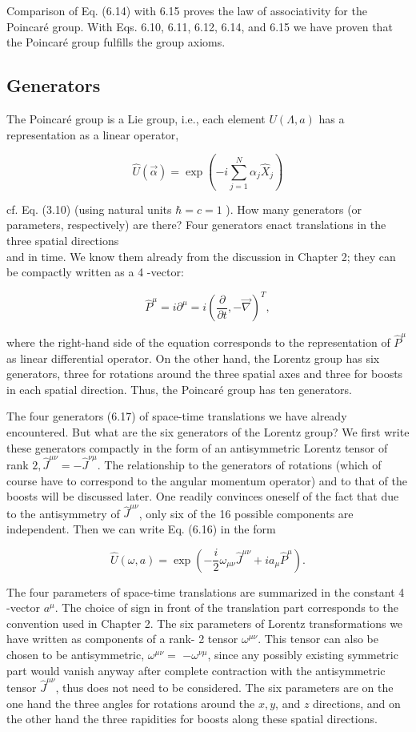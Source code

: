 \documentclass[10pt, letterpaper]{article}
\begin{document}
Comparison of Eq. (6.14) with 6.15 proves the law of associativity for the Poincaré group. With Eqs. 6.10, 6.11, 6.12, 6.14, and 6.15 we have proven that the Poincaré group fulfills the group axioms.

\subsection{Generators}
The Poincaré group is a Lie group, i.e., each element $U(\Lambda, a)$ has a representation as a linear operator,

$$
\hat{U}(\vec{\alpha})=\exp \left(-i \sum_{j=1}^{N} \alpha_{j} \hat{X}_{j}\right)
$$

cf. Eq. (3.10) (using natural units $\hbar=c=1$ ). How many generators (or parameters, respectively) are there? Four generators enact translations in the three spatial directions\\
and in time. We know them already from the discussion in Chapter 2; they can be compactly written as a 4 -vector:

$$
\hat{P}^{\mu}=i \partial^{\mu}=i\left(\frac{\partial}{\partial t},-\vec{\nabla}\right)^{T},
$$

where the right-hand side of the equation corresponds to the representation of $\hat{P}^{\mu}$ as linear differential operator. On the other hand, the Lorentz group has six generators, three for rotations around the three spatial axes and three for boosts in each spatial direction. Thus, the Poincaré group has ten generators.

The four generators (6.17) of space-time translations we have already encountered. But what are the six generators of the Lorentz group? We first write these generators compactly in the form of an antisymmetric Lorentz tensor of rank $2, \hat{J}^{\mu \nu}=-\hat{J}^{\nu \mu}$. The relationship to the generators of rotations (which of course have to correspond to the angular momentum operator) and to that of the boosts will be discussed later. One readily convinces oneself of the fact that due to the antisymmetry of $\hat{J}^{\mu \nu}$, only six of the 16 possible components are independent. Then we can write Eq. (6.16) in the form

$$
\hat{U}(\omega, a)=\exp \left(-\frac{i}{2} \omega_{\mu \nu} \hat{J}^{\mu \nu}+i a_{\mu} \hat{P}^{\mu}\right) .
$$

The four parameters of space-time translations are summarized in the constant 4 -vector $a^{\mu}$. The choice of sign in front of the translation part corresponds to the convention used in Chapter 2. The six parameters of Lorentz transformations we have written as components of a rank- 2 tensor $\omega^{\mu \nu}$. This tensor can also be chosen to be antisymmetric, $\omega^{\mu \nu}=$ $-\omega^{\nu \mu}$, since any possibly existing symmetric part would vanish anyway after complete contraction with the antisymmetric tensor $\hat{J}^{\mu \nu}$, thus does not need to be considered. The six parameters are on the one hand the three angles for rotations around the $x, y$, and $z$ directions, and on the other hand the three rapidities for boosts along these spatial directions.
\end{document}
